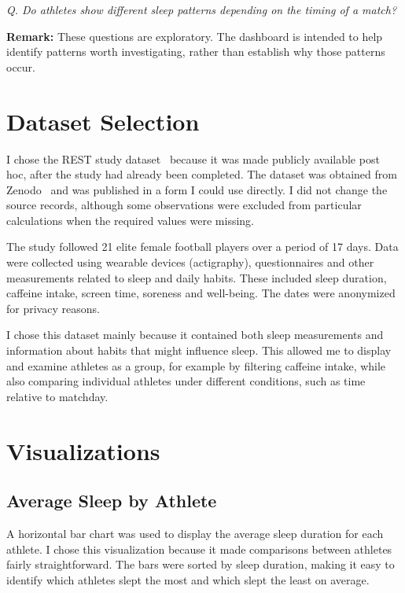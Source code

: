 \documentclass[11pt,a4paper]{article}
\newcounter{researchquestion}
\newcommand{\researchquestion}[2]{%
    \refstepcounter{researchquestion}%
    \label{#1}%
    \par\vspace{4pt}
    \noindent\hspace{0.5cm}%
    \begin{minipage}{\dimexpr\linewidth-0.5cm\relax}
        \textit{Q\theresearchquestion. #2}%
    \end{minipage}
    \par\vspace{4pt}
}
\begin{document}
\researchquestion{q:matchday}{
    Do athletes show different sleep patterns depending
    on the timing of a match?
}

\textbf{Remark:}
These questions are exploratory. The dashboard is intended to help identify patterns worth investigating, rather than establish why those patterns occur.


\section{Dataset Selection}
\label{sec:dataset}

I chose the REST study dataset~\cite{boeker2026rest} because it was made publicly available post hoc, after the study had already been completed. The dataset was obtained from Zenodo~\cite{restdata2025} and was published in a form I could use directly. I did not change the source records, although some observations were excluded from particular calculations when the required values were missing.

The study followed 21 elite female football players over a period of 17 days. Data were collected using wearable devices (actigraphy), questionnaires and other measurements related to sleep and daily habits. These included sleep duration, caffeine intake, screen time, soreness and well-being. The dates were anonymized for privacy reasons.

I chose this dataset mainly because it contained both sleep measurements and information about habits that might influence sleep. This allowed me to display and examine athletes as a group, for example by filtering caffeine intake, while also comparing individual athletes under different conditions, such as time relative to matchday.


\section{Visualizations}
\label{sec:visualizations}

\subsection*{Average Sleep by Athlete}

A horizontal bar chart was used to display the average sleep duration for each athlete. I chose this visualization because it made comparisons between athletes fairly straightforward. The bars were sorted by sleep duration, making it easy to identify which athletes slept the most and which slept the least on average.
\end{document}
